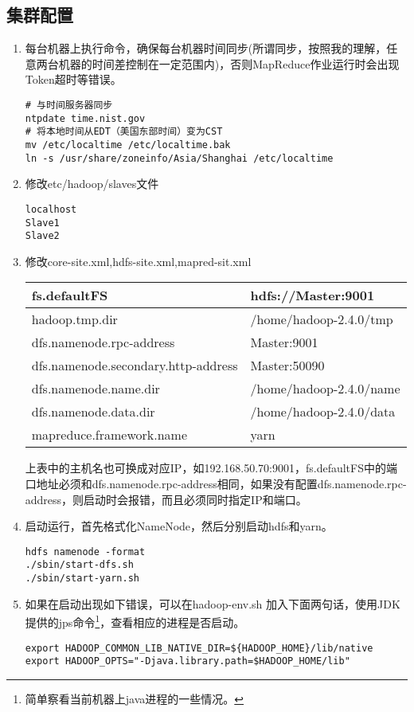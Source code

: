 \subsection{集群配置}
\begin{enumerate}[(1)]
\item 每台机器上执行命令，确保每台机器时间同步(所谓同步，按照我的理解，任意两台机器的时间差控制在一定范围内)，否则MapReduce作业运行时会出现Token超时等错误。
\begin{verbatim}
# 与时间服务器同步
ntpdate time.nist.gov
# 将本地时间从EDT（美国东部时间）变为CST
mv /etc/localtime /etc/localtime.bak
ln -s /usr/share/zoneinfo/Asia/Shanghai /etc/localtime
\end{verbatim}
\item 修改etc/hadoop/slaves文件
\begin{verbatim}
localhost
Slave1
Slave2
\end{verbatim}
\item 修改core-site.xml,hdfs-site.xml,mapred-sit.xml
\begin{table}[h]
  \centering
  \begin{tabular}{|l|l|}
\hline
fs.defaultFS &hdfs://Master:9001 \\ \hline
hadoop.tmp.dir & /home/hadoop-2.4.0/tmp \\ \hline
dfs.namenode.rpc-address & Master:9001\\ \hline
dfs.namenode.secondary.http-address& Master:50090 \\ \hline
dfs.namenode.name.dir   & /home/hadoop-2.4.0/name\\ \hline
dfs.namenode.data.dir   &   /home/hadoop-2.4.0/data\\ \hline
mapreduce.framework.name &  yarn \\ \hline
  \end{tabular}
\end{table}
\par 上表中的主机名也可换成对应IP，如192.168.50.70:9001，fs.defaultFS中的端口地址必须和dfs.namenode.rpc-address相同，如果没有配置dfs.namenode.rpc-address，则启动时会报错，而且必须同时指定IP和端口。
\item 启动运行，首先格式化NameNode，然后分别启动hdfs和yarn。
\begin{verbatim}
hdfs namenode -format
./sbin/start-dfs.sh
./sbin/start-yarn.sh
\end{verbatim}
\item 如果在启动出现如下错误，可以在hadoop-env.sh 加入下面两句话，使用JDK提供的jps命令\footnote{简单察看当前机器上java进程的一些情况。}，查看相应的进程是否启动。
\begin{verbatim}
export HADOOP_COMMON_LIB_NATIVE_DIR=${HADOOP_HOME}/lib/native
export HADOOP_OPTS="-Djava.library.path=$HADOOP_HOME/lib"
\end{verbatim}
\end{enumerate}

